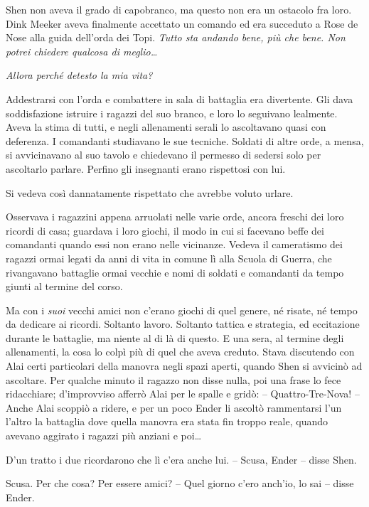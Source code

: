 {Shen non aveva il grado di capobranco, ma questo non era un ostacolo
	fra loro. Dink Meeker aveva finalmente accettato un comando ed era
	succeduto a Rose de Nose alla guida dell'orda dei Topi. \emph{Tutto sta
		andando bene, più che bene. Non potrei chiedere qualcosa di
		meglio\ldots{}}}

\emph{{Allora perché detesto la mia vita?}}

{Addestrarsi con l'orda e combattere in sala di battaglia era
	divertente. Gli dava soddisfazione istruire i ragazzi del suo branco, e
	loro lo seguivano lealmente. Aveva la stima di tutti, e negli
	allenamenti serali lo ascoltavano quasi con deferenza. I comandanti
	studiavano le sue tecniche. Soldati di altre orde, a mensa, si
	avvicinavano al suo tavolo e chiedevano il permesso di sedersi solo per
	ascoltarlo parlare. Perfino gli insegnanti erano rispettosi con lui.}

{Si vedeva così dannatamente rispettato che avrebbe voluto urlare.}

{Osservava i ragazzini appena arruolati nelle varie orde, ancora freschi
	dei loro ricordi di casa; guardava i loro giochi, il modo in cui si
	facevano beffe dei comandanti quando essi non erano nelle vicinanze.
	Vedeva il cameratismo dei ragazzi ormai legati da anni di vita in comune
	lì alla Scuola di Guerra, che rivangavano battaglie ormai vecchie e nomi
	di soldati e comandanti da tempo giunti al termine del corso.}

{Ma con i \emph{suoi} vecchi amici non c'erano giochi di quel genere, né
	risate, né tempo da dedicare ai ricordi. Soltanto lavoro. Soltanto
	tattica e strategia, ed eccitazione durante le battaglie, ma niente al
	di là di questo. E una sera, al termine degli allenamenti, la cosa lo
	colpì più di quel che aveva creduto. Stava discutendo con Alai certi
	particolari della manovra negli spazi aperti, quando Shen si avvicinò ad
	ascoltare. Per qualche minuto il ragazzo non disse nulla, poi una frase
	lo fece ridacchiare; d'improvviso afferrò Alai per le spalle e gridò: --
	Quattro-Tre-Nova! -- Anche Alai scoppiò a ridere, e per un poco Ender li
	ascoltò rammentarsi l'un l'altro la battaglia dove quella manovra era
	stata fin troppo reale, quando avevano aggirato i ragazzi più anziani e
	poi\ldots{}}

{D'un tratto i due ricordarono che lì c'era anche lui. -- Scusa, Ender
	-- disse Shen.}

{Scusa. Per che cosa? Per essere amici? -- Quel giorno c'ero anch'io, lo
	sai -- disse Ender.}

